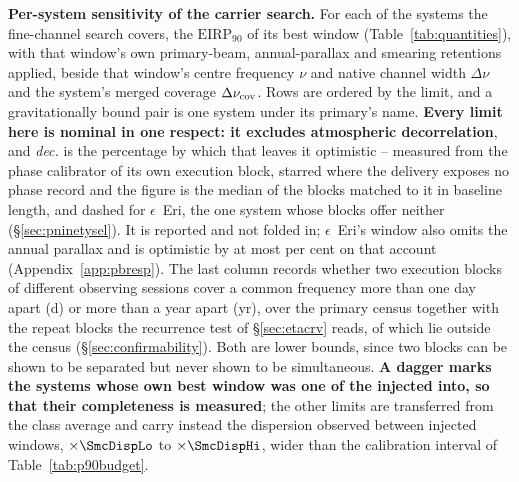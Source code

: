 \begin{table}
\centering
\caption{\textbf{Per-system sensitivity of the carrier search.} For each of
the \NSysClassA{} systems the fine-channel search covers, the
$\mathrm{EIRP}_{90}$ of its best window (Table~\ref{tab:quantities}), with
that window's own primary-beam, annual-parallax and smearing retentions
applied, beside that window's centre frequency $\nu$ and native channel
width $\Delta\nu$ and the system's merged coverage $\Delta\nu_{\rm cov}$.
Rows are ordered by the limit, and a gravitationally bound pair is one
system under its primary's name.
\textbf{Every limit here is nominal in one respect: it excludes atmospheric
decorrelation}, and \emph{dec.} is the percentage by which that leaves it
optimistic -- measured from the phase calibrator of its own execution block,
starred where the delivery exposes no phase record and the figure is the
median of the blocks matched to it in baseline length, and dashed for
$\epsilon$~Eri, the one system whose blocks offer neither
(\S\ref{sec:pninetysel}). It is reported and not folded in;
$\epsilon$~Eri's window also omits the annual parallax and is optimistic by
at most \BmEpsPxBoundPct{} per cent on that account
(Appendix~\ref{app:pbresp}).
The last column records whether two execution blocks of different observing
sessions cover a common frequency more than one day apart (d) or more than a
year apart (yr), over the primary census together with the \ZcNRecEB{}
repeat blocks the recurrence test of \S\ref{sec:etacrv} reads, of which
\ZcNRecEBOut{} lie outside the census (\S\ref{sec:confirmability}). Both are
lower bounds, since two blocks can be shown to be separated but never shown
to be simultaneous.
\textbf{A dagger marks the \SmcNMeasSys{} systems whose own best window was
one of the \SensNInj{} injected into, so that their completeness is
measured}; the other \SmcNEstSys{} limits are transferred from the class
average and carry instead the dispersion observed between injected windows,
$\times\SmcDispLo$ to $\times\SmcDispHi$, wider than the calibration
interval of Table~\ref{tab:p90budget}.}
\label{tab:persys}
\footnotesize

\end{table}

